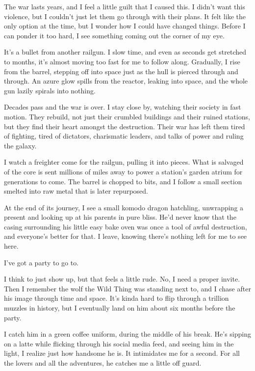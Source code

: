The war lasts years, and I feel a little guilt that I caused this. I didn't want this violence, but I couldn't just let them go through with their plans. It felt like the only option at the time, but I wonder how I could have changed things. Before I can ponder it too hard, I see something coming out the corner of my eye.

It's a bullet from another railgun. I slow time, and even as seconds get stretched to months, it's almost moving too fast for me to follow along. Gradually, I rise from the barrel, stepping off into space just as the hull is pierced through and through. An azure glow spills from the reactor, leaking into space, and the whole gun lazily spirals into nothing.

Decades pass and the war is over. I stay close by, watching their society in fast motion. They rebuild, not just their crumbled buildings and their ruined stations, but they find their heart amongst the destruction. Their war has left them tired of fighting, tired of dictators, charismatic leaders, and talks of power and ruling the galaxy.

I watch a freighter come for the railgun, pulling it into pieces. What is salvaged of the core is sent millions of miles away to power a station's garden atrium for generations to come. The barrel is chopped to bits, and I follow a small section smelted into raw metal that is later repurposed.

At the end of its journey, I see a small komodo dragon hatchling, unwrapping a present and looking up at his parents in pure bliss. He'd never know that the casing surrounding his little easy bake oven was once a tool of awful destruction, and everyone's better for that. I leave, knowing there's nothing left for me to see here.

I've got a party to go to.

I think to just show up, but that feels a little rude. No, I need a proper invite. Then I remember the wolf the Wild Thing was standing next to, and I chase after his image through time and space. It's kinda hard to flip through a trillion muzzles in history, but I eventually land on him about six months before the party.

I catch him in a green coffee uniform, during the middle of his break. He's sipping on a latte while flicking through his social media feed, and seeing him in the light, I realize just how handsome he is. It intimidates me for a second. For all the lovers and all the adventures, he catches me a little off guard.


